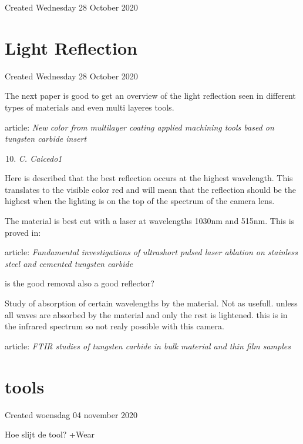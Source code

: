 \documentclass{article}
\begin{document}
Created Wednesday 28 October 2020




		\section{Light Reflection}

Created Wednesday 28 October 2020



The next paper is good to get an overview of the light reflection seen in different types of materials and even multi layeres tools.

	article: \emph{New color from multilayer coating applied machining tools based on tungsten carbide insert}
	
	\begin{enumerate}[A]
	\setcounter{enumi}{9}
	\item \emph{C. Caicedo1}
	\end{enumerate}


Here is described that the best reflection occurs at the highest wavelength. This translates to the visible color red and will mean that the reflection should be the highest when the lighting is on the top of the spectrum of the camera lens. 



The material is best cut with a laser at wavelengths 1030nm and 515nm. This is proved in: 

	article: \emph{Fundamental investigations of ultrashort pulsed laser ablation on stainless steel and cemented tungsten carbide}
	
	is the good removal also a good reflector?
	
		

Study of absorption of certain wavelengths by the material. Not as usefull. unless all waves are absorbed by the material and only the rest is lightened. this is in the infrared spectrum so not realy possible with this camera.

	article: \emph{FTIR studies of tungsten carbide in bulk material and thin film samples}
	

		\section{tools}

Created woensdag 04 november 2020



Hoe slijt de tool? +Wear
\end{document}
